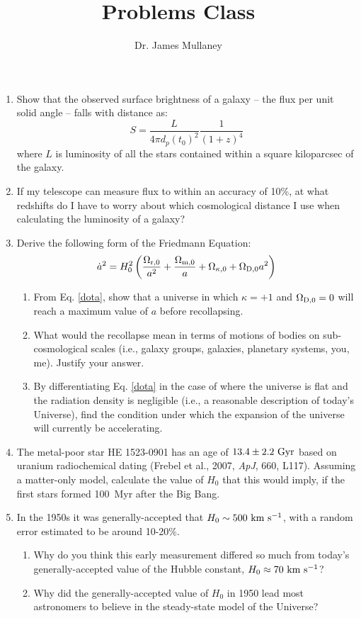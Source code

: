 \documentclass[11pt]{article}
\begin{document}
 
\title{Problems Class }
\author{Dr. James Mullaney}
\maketitle

\begin{enumerate}
\item Show that the observed surface brightness of a galaxy -- the flux per unit solid angle -- falls with distance as:
\begin{equation*}
S = \frac{L}{4\pi d_p(t_0)^2}\frac{1}{(1+z)^4}
\end{equation*}
where $L$ is luminosity of all the stars contained within a square kiloparcsec of the galaxy.

\item If my telescope can measure flux to within an accuracy of 10\%, at what redshifts do I have to worry about which cosmological distance I use when calculating the luminosity of a galaxy?
 
\item Derive the following form of the Friedmann Equation:
\begin{equation}
    \label{dota}
    \dot{a}^2 = H_0^2\left(\frac{\Omega_{\rm r,0}}{a^2}+\frac{\Omega_{\rm m,0}}{a}+\Omega_{\rm \kappa,0}+\Omega_{\rm D,0}a^2\right)
\end{equation}
\begin{enumerate}
\item From Eq. \ref{dota}, show that a universe in which $\kappa=+1$ and $\Omega_{\rm D,0}=0$ will reach a maximum value of $a$ before recollapsing.
\item What would the recollapse mean in terms of motions of bodies on sub-cosmological scales (i.e., galaxy groups, galaxies, planetary systems, you, me). Justify your answer.
\item By differentiating Eq. \ref{dota} in the case of where the universe is flat and the radiation density is negligible (i.e., a reasonable description of today's Universe), find the condition under which the expansion of the universe will currently be accelerating.
\end{enumerate}
\item The metal-poor star HE 1523-0901 has an age of $13.4\pm2.2~{\rm Gyr}$ based on uranium radiochemical dating (Frebel et al., 2007, {\it ApJ}, 660, L117). Assuming a matter-only model, calculate the value of $H_0$ that this would imply, if the first stars formed 100~Myr after the Big Bang.
\item In the 1950s it was generally-accepted that $H_0\sim 500~{\rm km~s^{-1}}$, with a random error estimated to be around 10-20\%.
\begin{enumerate}
\item Why do you think this early measurement differed so much from today's generally-accepted value of the Hubble constant, $H_0\approx70~{\rm km~s^{-1}}$?
\item Why did the generally-accepted value of $H_0$ in 1950 lead most astronomers to believe in the steady-state model of the Universe?
\end{enumerate}

\end{enumerate}
\end{document}
